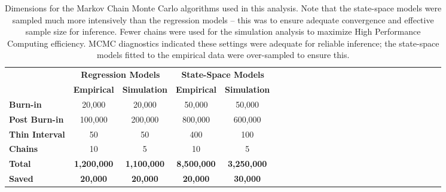 \documentclass[12pt,]{book}
\theoremstyle{definition}
\theoremstyle{definition}
\theoremstyle{definition}
\theoremstyle{remark}
\begin{document}
\clearpage

\begin{table}

\caption{\label{tab:mcmc-table}Dimensions for the Markov Chain Monte Carlo algorithms used in this analysis. Note that the state-space models were sampled much more intensively than the regression models -- this was to ensure adequate convergence and effective sample size for inference. Fewer chains were used for the simulation analysis to maximize High Performance Computing efficiency. MCMC diagnostics indicated these settings were adequate for reliable inference; the state-space models fitted to the empirical data were over-sampled to ensure this.}
\centering
\begin{tabular}[t]{lcccclcccclcccclcccclcccc}
\toprule
\multicolumn{1}{c}{\bfseries } & \multicolumn{2}{c}{\bfseries Regression Models} & \multicolumn{2}{c}{\bfseries State-Space Models} \\
\cmidrule(l{2pt}r{2pt}){2-3} \cmidrule(l{2pt}r{2pt}){4-5}
\textbf{} & \textbf{Empirical} & \textbf{Simulation} & \textbf{Empirical} & \textbf{Simulation}\\
\midrule
\textbf{Burn-in} & 20,000 & 20,000 & 50,000 & 50,000\\
\textbf{Post Burn-in} & 100,000 & 200,000 & 800,000 & 600,000\\
\textbf{Thin Interval} & 50 & 50 & 400 & 100\\
\textbf{Chains} & 10 & 5 & 10 & 5\\
\hline
\textbf{\textbf{Total}} & \textbf{1,200,000} & \textbf{1,100,000} & \textbf{8,500,000} & \textbf{3,250,000}\\
\textbf{\textbf{Saved}} & \textbf{20,000} & \textbf{20,000} & \textbf{20,000} & \textbf{30,000}\\
\bottomrule
\end{tabular}
\end{table}

\clearpage
\end{document}
